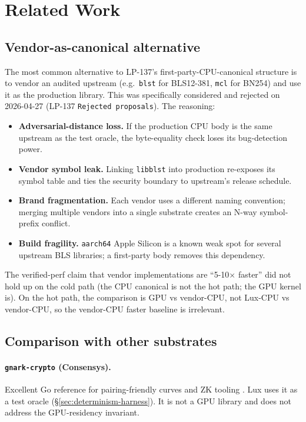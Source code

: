 \section{Related Work}
\label{sec:related-work}

\subsection{Vendor-as-canonical alternative}

The most common alternative to LP-137's first-party-CPU-canonical structure is to vendor an audited upstream (e.g.\ \texttt{blst} for BLS12-381, \texttt{mcl} for BN254) and use it as the production library. This was specifically considered and rejected on 2026-04-27 (LP-137 \texttt{Rejected proposals}). The reasoning:

\begin{itemize}
\item \textbf{Adversarial-distance loss.} If the production CPU body is the same upstream as the test oracle, the byte-equality check loses its bug-detection power.
\item \textbf{Vendor symbol leak.} Linking \texttt{libblst} into production re-exposes its symbol table and ties the security boundary to upstream's release schedule.
\item \textbf{Brand fragmentation.} Each vendor uses a different naming convention; merging multiple vendors into a single substrate creates an N-way symbol-prefix conflict.
\item \textbf{Build fragility.} \texttt{aarch64} Apple Silicon is a known weak spot for several upstream BLS libraries; a first-party body removes this dependency.
\end{itemize}

The verified-perf claim that vendor implementations are ``5-10$\times$ faster'' did not hold up on the cold path (the CPU canonical is not the hot path; the GPU kernel is). On the hot path, the comparison is GPU vs vendor-CPU, not Lux-CPU vs vendor-CPU, so the vendor-CPU faster baseline is irrelevant.

\subsection{Comparison with other substrates}

\paragraph{\texttt{gnark-crypto} (Consensys).} Excellent Go reference for pairing-friendly curves and ZK tooling \cite{gnarkcrypto}. Lux uses it as a test oracle (\S\ref{sec:determinism-harness}). It is not a GPU library and does not address the GPU-residency invariant.

